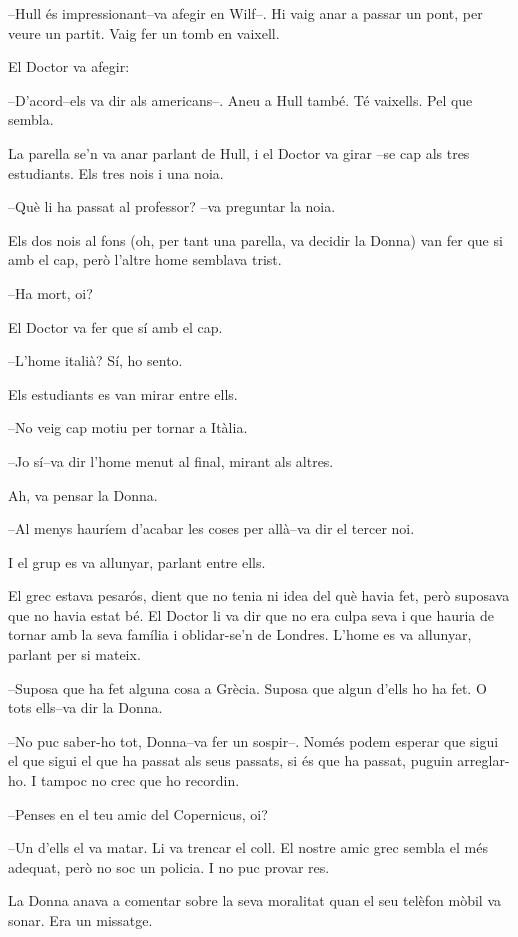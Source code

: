 --Hull és impressionant--va afegir en Wilf--. Hi vaig anar a passar un
pont, per veure un partit. Vaig fer un tomb en vaixell.

El Doctor va afegir:

--D'acord--els va dir als americans--. Aneu a Hull també. Té vaixells.
Pel que sembla.

La parella se'n va anar parlant de Hull, i el Doctor va girar --se cap
als tres estudiants. Els tres nois i una noia.

--Què li ha passat al professor? --va preguntar la noia.

Els dos nois al fons (oh, per tant una parella, va decidir la Donna) van
fer que si amb el cap, però l'altre home semblava trist.

--Ha mort, oi?

El Doctor va fer que sí amb el cap.

--L'home italià? Sí, ho sento.

Els estudiants es van mirar entre ells.

--No veig cap motiu per tornar a Itàlia.

--Jo sí--va dir l'home menut al final, mirant als altres.

Ah, va pensar la Donna.

--Al menys hauríem d'acabar les coses per allà--va dir el tercer noi.

I el grup es va allunyar, parlant entre ells.

El grec estava pesarós, dient que no tenia ni idea del què havia fet,
però suposava que no havia estat bé. El Doctor li va dir que no era
culpa seva i que hauria de tornar amb la seva família i oblidar-se'n de
Londres. L'home es va allunyar, parlant per si mateix.

--Suposa que ha fet alguna cosa a Grècia. Suposa que algun d'ells ho ha
fet. O tots ells--va dir la Donna.

--No puc saber-ho tot, Donna--va fer un sospir--. Només podem esperar
que sigui el que sigui el que ha passat als seus passats, si és que ha
passat, puguin arreglar-ho. I tampoc no crec que ho recordin.

--Penses en el teu amic del Copernicus, oi?

--Un d'ells el va matar. Li va trencar el coll. El nostre amic grec
sembla el més adequat, però no soc un policia. I no puc provar res.

La Donna anava a comentar sobre la seva moralitat quan el seu telèfon
mòbil va sonar. Era un missatge.

